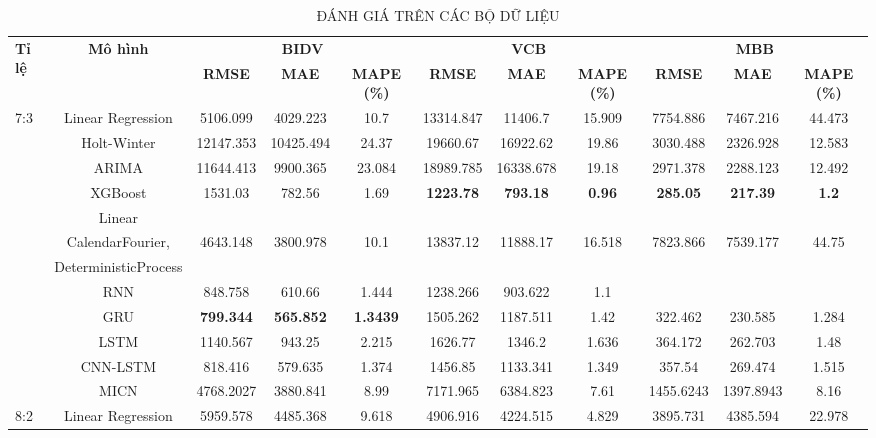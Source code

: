 \documentclass[conference]{IEEEtran}
\begin{document}
\begin{table}[t]
\centering
\caption{ĐÁNH GIÁ TRÊN CÁC BỘ DỮ LIỆU}
\begin{tabular}{lcccccccccc}
\toprule
\multirow{2}{*}{\textbf{Tỉ lệ}} & \multirow{2}{*}{\textbf{Mô hình}} & \multicolumn{3}{c}{\textbf{BIDV}} & \multicolumn{3}{c}{\textbf{VCB}} & \multicolumn{3}{c}{\textbf{MBB}} \\ 
\cmidrule(lr){3-5} \cmidrule(lr){6-8} \cmidrule(lr){9-11}
 &  & \textbf{RMSE} & \textbf{MAE} & \textbf{MAPE (\%)} & \textbf{RMSE} & \textbf{MAE} & \textbf{MAPE (\%)} & \textbf{RMSE} & \textbf{MAE} & \textbf{MAPE (\%)} \\ 
\midrule
\multirow{10}{*}{7:3} 
                    & Linear Regression & 5106.099 & 4029.223 & 10.7 & 13314.847 & 11406.7 & 15.909 & 7754.886 & 7467.216 & 44.473\\
                    & Holt-Winter & 12147.353 & 10425.494 & 24.37 & 19660.67 & 16922.62 & 19.86 & 3030.488 & 2326.928 & 12.583\\
                    & ARIMA & 11644.413 & 9900.365 & 23.084 & 18989.785 & 16338.678 & 19.18 & 2971.378 & 2288.123 & 12.492\\
                    & XGBoost & 1531.03 & 782.56 & 1.69 & \textbf{1223.78} & \textbf{793.18} & \textbf{0.96} & \textbf{285.05} & \textbf{217.39} & \textbf{1.2}\\
                    & Linear & & & \\
                    & CalendarFourier, & 4643.148 & 3800.978 & 10.1 & 13837.12 & 11888.17 & 16.518 & 7823.866 & 7539.177 & 44.75\\
                    & DeterministicProcess & & & \\
                    & RNN & 848.758 & 610.66 & 1.444 & 1238.266 & 903.622 & 1.1\\
                    & GRU &  \textbf{799.344} &  \textbf{565.852} &  \textbf{1.3439} & 1505.262 & 1187.511 & 1.42 & 322.462 & 230.585 & 1.284\\
                    & LSTM & 1140.567 & 943.25 & 2.215 & 1626.77 & 1346.2 & 1.636 & 364.172 & 262.703 & 1.48\\
                    & CNN-LSTM & 818.416 & 579.635 & 1.374 & 1456.85 & 1133.341 & 1.349 & 357.54 & 269.474 & 1.515\\
                    & MICN & 4768.2027 & 3880.841 & 8.99 & 7171.965 & 6384.823 & 7.61 & 1455.6243 & 1397.8943 & 8.16\\
                    \midrule
\multirow{10}{*}{8:2} 
                    & Linear Regression & 5959.578 & 4485.368 & 9.618 & 4906.916 & 4224.515 & 4.829 & 3895.731 & 4385.594 & 22.978\\

\end{tabular}
\end{table}
\end{document}
